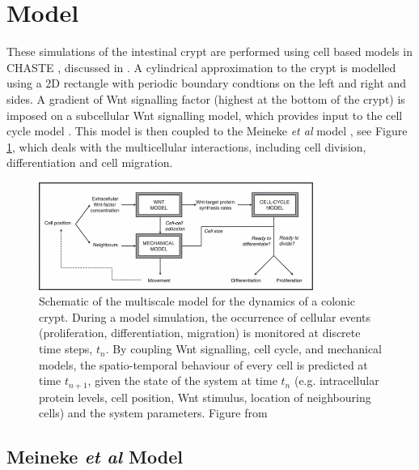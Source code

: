 \documentclass[11pt]{article} %
\begin{document}
\section{Model}

These simulations of the intestinal crypt are performed using cell based models in CHASTE \cite{Mirams2013}, discussed in \cite{VanLeeuwen2009}. A cylindrical approximation to the crypt is modelled using a 2D rectangle with periodic boundary condtions on the left and right and sides. A gradient of Wnt signalling factor (highest at the bottom of the crypt) is imposed on a   subcellular Wnt signalling model, which provides input to  the cell cycle model \cite{Swat2004}. This model is then coupled to the Meineke \textit{et al} model \cite{Meineke2001}, see Figure \ref{fig:Multiscale_Model}, which deals with the multicellular interactions, including cell division, differentiation and cell migration.

\begin{figure}
\centering
\includegraphics[width=0.8\textwidth]{Model_Summary}
\caption{Schematic of the multiscale model for the dynamics of a colonic crypt. During a model simulation, the occurrence of cellular events
(proliferation, differentiation, migration) is monitored at discrete time steps, $t_n$. By coupling Wnt signalling, cell cycle, and mechanical models, the spatio-temporal behaviour  of every cell is predicted at time $t_{n+1}$, given the state of the system at time $t_n$ (e.g. intracellular protein levels,
cell position, Wnt stimulus, location of neighbouring cells) and the system parameters. Figure from \cite{VanLeeuwen2009}}
\label{fig:Multiscale_Model}
\end{figure}

\subsection{Meineke \textit{et al} Model}
\end{document}
